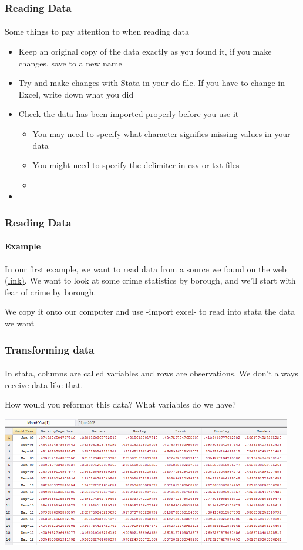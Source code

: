 \documentclass{beamer}
\begin{document}
\begin{frame}
  \frametitle{Reading Data}
  \framesubtitle{}
Some things to pay attention to when reading data
  \begin{itemize}
    \item Keep an original copy of the data exactly as you found it, if you make changes, save to a new name
    \item Try and make changes with Stata in your do file. If you have to change in Excel, write down what you did
    \item Check the data has been imported properly before you use it
	\begin{itemize}
	    \item You may need to specify what character signifies missing values in your data 
	    \item You might need to specify the delimiter in csv or txt files
	    \item 
	\end{itemize}
    \item 

  \end{itemize}
\end{frame}

\begin{frame}
  \frametitle{Reading Data}
  \framesubtitle{Example}
In our first example, we want to read data from a source we found on the web \href{http://data.london.gov.uk/dataset/metropolitan-police-service-recorded-crime-figures-and-associated-data/resource/e831234d-2bde-4fff-8ab8-7e2e70f0677a}{(link)}. We want to look at some crime statistics by borough, and we'll start with fear of crime by borough.

We copy it onto our computer and use -import excel- to read into stata the data we want


\end{frame}

\begin{frame}
  \frametitle{Transforming data}
  \framesubtitle{}
In stata, columns are called variables and rows are observations. We don't always receive data like that.

\smallskip

How would you reformat this data? What variables do we have?

\includegraphics[width=5in]{data.PNG}
\end{frame}
\end{document}

